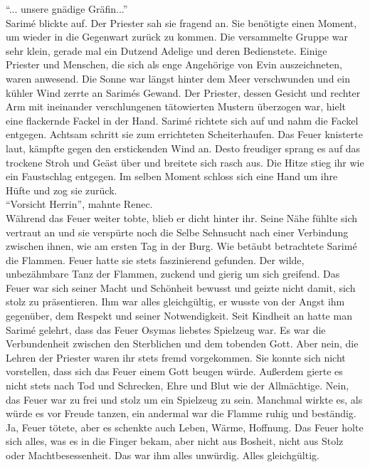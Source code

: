 ``... unsere gnädige Gräfin...''\\
Sarimé blickte auf. Der Priester sah sie fragend an. Sie benötigte einen Moment, um wieder in die 
Gegenwart zurück zu kommen. Die versammelte Gruppe war sehr klein, gerade mal ein Dutzend Adelige 
und deren Bedienstete. Einige Priester und Menschen, die sich als enge Angehörige von Evin 
auszeichneten, waren anwesend. Die Sonne war längst hinter dem Meer verschwunden und ein kühler 
Wind zerrte an Sarimés Gewand. Der Priester, dessen Gesicht und rechter Arm mit ineinander 
verschlungenen tätowierten Mustern überzogen war, hielt eine flackernde Fackel in der Hand. Sarimé 
richtete sich auf und nahm die Fackel entgegen. Achtsam schritt sie zum errichteten Scheiterhaufen. 
Das Feuer knisterte laut, kämpfte gegen den erstickenden Wind an. Desto freudiger sprang es auf das 
trockene Stroh und Geäst über und breitete sich rasch aus. Die Hitze stieg ihr wie ein Faustschlag 
entgegen. Im selben Moment schloss sich eine Hand um ihre Hüfte und zog sie zurück. \\
``Vorsicht Herrin'', mahnte Renec. \\
Während das Feuer weiter tobte, blieb er dicht hinter ihr. Seine Nähe fühlte sich vertraut an und 
sie verspürte noch die Selbe Sehnsucht nach einer Verbindung zwischen ihnen, wie am ersten Tag in 
der Burg. Wie betäubt betrachtete Sarimé die Flammen. Feuer hatte sie stets faszinierend gefunden. 
Der wilde, unbezähmbare Tanz der Flammen, zuckend und gierig um sich greifend. Das Feuer war sich 
seiner Macht und Schönheit bewusst und geizte nicht damit, sich stolz zu präsentieren. Ihm war  
alles gleichgültig, er wusste von der Angst ihm gegenüber, dem Respekt und seiner Notwendigkeit. 
Seit Kindheit an hatte man Sarimé gelehrt, dass das Feuer Osymas liebstes Spielzeug war. Es war die 
Verbundenheit zwischen den Sterblichen und dem tobenden Gott. Aber nein, die Lehren der Priester 
waren ihr stets fremd vorgekommen. Sie konnte sich nicht vorstellen, dass sich das Feuer einem Gott 
beugen würde. Außerdem gierte es nicht stets nach Tod und Schrecken, Ehre und Blut wie der 
Allmächtige. Nein, das Feuer war zu frei und stolz um ein Spielzeug zu sein. Manchmal wirkte es, 
als würde es vor Freude tanzen, ein andermal war die Flamme ruhig und beständig. Ja, Feuer tötete, 
aber es schenkte auch Leben, Wärme, Hoffnung. Das Feuer holte sich alles, was es in die Finger 
bekam, aber nicht aus Bosheit, nicht aus Stolz oder Machtbesessenheit. Das war ihm alles unwürdig. 
Alles gleichgültig.\\
